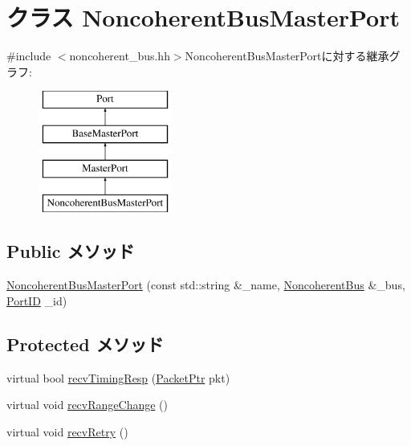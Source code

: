\hypertarget{classNoncoherentBus_1_1NoncoherentBusMasterPort}{
\section{クラス NoncoherentBusMasterPort}
\label{classNoncoherentBus_1_1NoncoherentBusMasterPort}
}


{\ttfamily \#include $<$noncoherent\_\-bus.hh$>$}NoncoherentBusMasterPortに対する継承グラフ:\begin{figure}[H]
\begin{center}
\leavevmode
\includegraphics[height=4cm]{classNoncoherentBus_1_1NoncoherentBusMasterPort}
\end{center}
\end{figure}
\subsection*{Public メソッド}
\begin{DoxyCompactItemize}
\item 
\hyperlink{classNoncoherentBus_1_1NoncoherentBusMasterPort_a8340f584bc1b01456a1c7f25d4049eef}{NoncoherentBusMasterPort} (const std::string \&\_\-name, \hyperlink{classNoncoherentBus}{NoncoherentBus} \&\_\-bus, \hyperlink{base_2types_8hh_acef4d7d41cb21fdc252e20c04cd7bb8e}{PortID} \_\-id)
\end{DoxyCompactItemize}
\subsection*{Protected メソッド}
\begin{DoxyCompactItemize}
\item 
virtual bool \hyperlink{classNoncoherentBus_1_1NoncoherentBusMasterPort_a197a199a6dabb291067a978d54bd2d04}{recvTimingResp} (\hyperlink{classPacket}{PacketPtr} pkt)
\item 
virtual void \hyperlink{classNoncoherentBus_1_1NoncoherentBusMasterPort_af60d9c2c17fb4c9ebc5384a7e0c9f289}{recvRangeChange} ()
\item 
virtual void \hyperlink{classNoncoherentBus_1_1NoncoherentBusMasterPort_a7ec461ad187b82b4b21e27c86e45cf9c}{recvRetry} ()
\end{DoxyCompactItemize}
